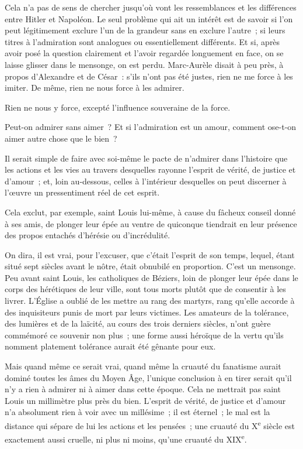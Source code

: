 \documentclass[french,twoside]{book} %
\begin{document}
Cela n'a pas de sens de chercher jusqu'où vont les ressemblances et les différences entre Hitler et Napoléon. Le seul problème qui ait un intérêt est de savoir si l'on peut légitimement exclure l'un de la grandeur sans en exclure l'autre ; si leurs titres à l'admiration sont analogues ou essentiellement différents. Et si, après avoir posé la question clairement et l'avoir regardée longuement en face, on se laisse glisser dans le mensonge, on est perdu. Marc-Aurèle disait à peu près, à propos d'Alexandre et de César : s'ils n'ont pas été justes, rien ne me force à les imiter. De même, rien ne nous force à les admirer.\par
Rien ne nous y force, excepté l'influence souveraine de la force.\par
Peut-on admirer sans aimer ? Et si l'admiration est un amour, comment ose-t-on aimer autre chose que le bien ?\par
Il serait simple de faire avec soi-même le pacte de n'admirer dans l'histoire que les actions et les vies au travers desquelles rayonne l'esprit de vérité, de justice et d'amour ; et, loin au-dessous, celles à l'intérieur desquelles on peut discerner à l'œuvre un pressentiment réel de cet esprit.\par
Cela exclut, par exemple, saint Louis lui-même, à cause du fâcheux conseil donné à ses amis, de plonger leur épée au ventre de quiconque tiendrait en leur présence des propos entachés d'hérésie ou d'incrédulité.\par
On dira, il est vrai, pour l'excuser, que c'était l'esprit de son temps, lequel, étant situé sept siècles avant le nôtre, était obnubilé en proportion. C'est un mensonge. Peu avant saint Louis, les catholiques de Béziers, loin de plonger leur épée dans le corps des hérétiques de leur ville, sont tous morts plutôt que de consentir à les livrer. L'Église a oublié de les mettre au rang des martyrs, rang qu'elle accorde à des inquisiteurs punis de mort par leurs victimes. Les amateurs de la tolérance, des lumières et de la laïcité, au cours des trois derniers siècles, n'ont guère commémoré ce souvenir non plus ; une forme aussi héroïque de la vertu qu'ils nomment platement tolérance aurait été gênante pour eux.\par
Mais quand même ce serait vrai, quand même la cruauté du fanatisme aurait dominé toutes les âmes du Moyen Âge, l'unique conclusion à en tirer serait qu'il n'y a rien à admirer ni à aimer dans cette époque. Cela ne mettrait pas saint Louis un millimètre plus près du bien. L'esprit de vérité, de justice et d'amour n'a absolument rien à voir avec un millésime ; il est éternel ; le mal est la distance qui sépare de lui les actions et les pensées ; une cruauté du X\textsuperscript{e} siècle est exactement aussi cruelle, ni plus ni moins, qu'une cruauté du XIX\textsuperscript{e}.\par
\end{document}
